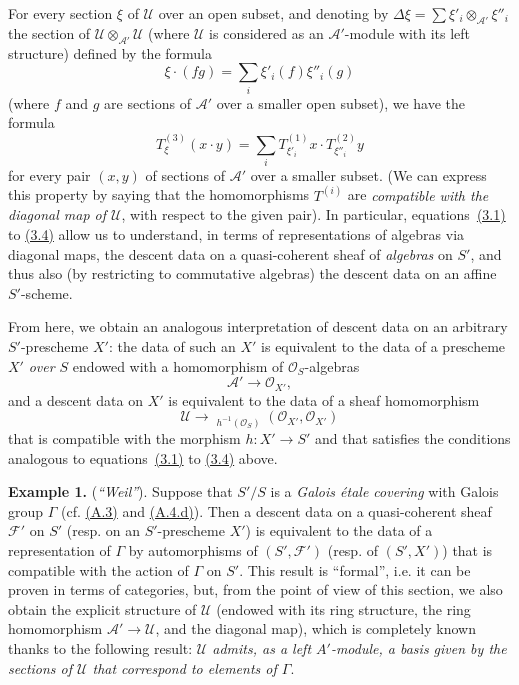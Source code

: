 \documentclass{article}
\newenvironment{rmenv}[1]
  {\phantomsection\par\medskip\noindent\textbf{#1.}\rmfamily}
  {\par\medskip}
\newcommand{\scr}[1]{{\mathscr{#1}}}
\renewcommand{\cal}[1]{{\mathcal{#1}}}
\DeclareMathOperator{\Hom}{Hom}
\DeclareMathOperator{\shHom}{\underline{\Hom}}
\newcommand{\oldpage}[1]{\marginpar{\footnotesize$\Big\vert$ \textit{p.~#1}}}
\begin{document}
For every section $\xi$ of $\scr{U}$ over an open subset, and denoting by $\Delta\xi=\sum\xi'_i\otimes_{\scr{A}'}\xi''_i$ the section of $\scr{U}\otimes_{\scr{A}'}\scr{U}$ (where $\scr{U}$ is considered as an $\scr{A}'$-module with its left structure) defined by the formula
\[
  \xi\cdot(fg) = \sum_i\xi'_i(f)\xi''_i(g)
\]
(where $f$ and $g$ are sections of $\scr{A}'$ over a smaller open subset), we have the formula
\[
\label{equation:B.3.4}
  T_\xi^{(3)}(x\cdot y) = \sum_i T_{\xi'_i}^{(1)}x\cdot T_{\xi''_i}^{(2)}y
\tag{3.4}
\]
for every pair $(x,y)$ of sections of $\scr{A}'$ over a smaller subset.
(We can express this property by saying that the homomorphisms $T^{(i)}$ are \emph{compatible with the diagonal map of $\scr{U}$}, with respect to the given pair).
In particular, equations~\hyperref[equation:B.3.1]{(3.1)} to \hyperref[equation:B.3.4]{(3.4)} allow us to understand, in terms of representations of algebras via diagonal maps, the descent data on a quasi-coherent sheaf of \emph{algebras} on $S'$, and thus also (by restricting to commutative algebras) the descent data on an affine $S'$-scheme.

From here, we obtain an analogous interpretation of descent data on an arbitrary $S'$-prescheme $X'$:
the data of such an $X'$ is equivalent to the data of a prescheme $X'$ \emph{over $S$} endowed with a homomorphism of $\scr{O}_S$-algebras
\[
  \scr{A}'\to\scr{O}_{X'},
\]
and a descent data on $X'$ is equivalent to the data of a sheaf homomorphism
\[
  \scr{U}
  \to \shHom_{h^{-1}(\scr{O}_S)}(\scr{O}_{X'},\scr{O}_{X'})
\]
that is compatible with the morphism $h\colon X'\to S'$ and that satisfies the conditions analogous to equations~\hyperref[equation:B.3.1]{(3.1)} to \hyperref[equation:B.3.4]{(3.4)} above.

\begin{rmenv}{Example 1}
\label{example:B.3(1)}
  (\emph{``Weil''}).
  Suppose that $S'/S$ is a \emph{Galois \'{e}tale covering} with Galois group $\Gamma$ (cf. \hyperref[A.3]{(A.3)} and \hyperref[A.4.d]{(A.4.d)}).
  Then a descent data on a quasi-coherent sheaf $\cal{F}'$ on $S'$ (resp. on an $S'$-prescheme $X'$) is equivalent to the data of a representation of $\Gamma$ by automorphisms of $(S',\cal{F}')$ (resp. of $(S',X')$) that is compatible with the action of $\Gamma$ on $S'$.
  This result
\oldpage{190-23}
  is ``formal'', i.e. it can be proven in terms of categories, but, from the point of view of this section, we also obtain the explicit structure of $\scr{U}$ (endowed with its ring structure, the ring homomorphism $\scr{A}'\to\scr{U}$, and the diagonal map), which is completely known thanks to the following result:
  \emph{$\scr{U}$ admits, as a left $A'$-module, a basis given by the sections of $\scr{U}$ that correspond to elements of $\Gamma$}.
\end{rmenv}
\end{document}
